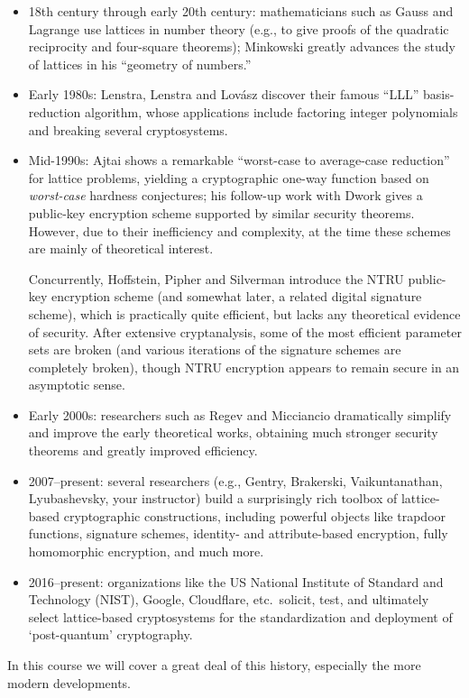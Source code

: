 \documentclass[11pt]{article}
\begin{document}
\begin{itemize}[itemsep=0pt]
\item 18th century through early 20th century: mathematicians such as
  Gauss and Lagrange use lattices in number theory (e.g., to give
  proofs of the quadratic reciprocity and four-square theorems);
  Minkowski greatly advances the study of lattices in his ``geometry
  of numbers.''

\item Early 1980s: Lenstra, Lenstra and Lov{\'a}sz discover their
  famous ``LLL'' basis-reduction algorithm, whose applications include
  factoring integer polynomials and breaking several cryptosystems.

\item Mid-1990s: Ajtai shows a remarkable ``worst-case to average-case
  reduction'' for lattice problems, yielding a cryptographic one-way
  function based on \emph{worst-case} hardness conjectures; his
  follow-up work with Dwork gives a public-key encryption scheme
  supported by similar security theorems. However, due to their
  inefficiency and complexity, at the time these schemes are mainly of
  theoretical interest.

  Concurrently, Hoffstein, Pipher and Silverman introduce the NTRU
  public-key encryption scheme (and somewhat later, a related digital
  signature scheme), which is practically quite efficient, but lacks
  any theoretical evidence of security. After extensive cryptanalysis,
  some of the most efficient parameter sets are broken (and various
  iterations of the signature schemes are completely broken), though
  NTRU encryption appears to remain secure in an asymptotic sense.

\item Early 2000s: researchers such as Regev and Micciancio
  dramatically simplify and improve the early theoretical works,
  obtaining much stronger security theorems and greatly improved
  efficiency.

\item 2007--present: several researchers (e.g., Gentry, Brakerski,
  Vaikuntanathan, Lyubashevsky, your instructor) build a surprisingly
  rich toolbox of lattice-based cryptographic constructions, including
  powerful objects like trapdoor functions, signature schemes,
  identity- and attribute-based encryption, fully homomorphic
  encryption, and much more.

\item 2016--present: organizations like the US National Institute of
  Standard and Technology (NIST), Google, Cloudflare, etc.\ solicit,
  test, and ultimately select lattice-based cryptosystems for
  the standardization and deployment of `post-quantum' cryptography.
\end{itemize}
In this course we will cover a great deal of this history, especially
the more modern developments.
\end{document}
